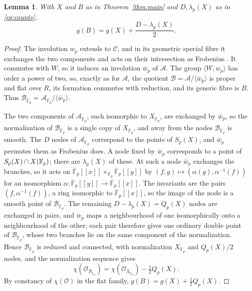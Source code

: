 \documentclass[11pt,a4paper]{article}
\newtheorem{lemma}[theorem]{Lemma}
\theoremstyle{remark}\newtheorem{remark}[theorem]{Remark}
\numberwithin{equation}{section}
\newcommand{\kk}{\overline{\mathbb F}_p}
\begin{document}
	\begin{lemma}\label{lem:aricheta}
		With $X$ and $B$ as in Theorem~\ref{thm:main} and $D,\lambda_p(X)$ as in \eqref{eq:counts},
		\begin{equation}\label{eq:gB}
			g(B)=g(X)+\frac{D-\lambda_p(X)}2.
		\end{equation}
	\end{lemma}
	\begin{proof}
		The involution $w_p$ extends to $\mathscr C$, and in its geometric special fibre it exchanges the two components and acts on their intersection as Frobenius \cite[Proposition 3.8(i)]{Ribet}. It commutes with $W$, so it induces an involution $\bar w_p$ of $\mathscr A$. The group $\langle W,w_p\rangle$ has order a power of two, so, exactly as for $\mathscr A$, the quotient $\mathscr B=\mathscr A/\langle\bar w_p\rangle$ is proper and flat over $R$, its formation commutes with reduction, and its generic fibre is $B$. Thus $\mathscr B_{\kk}=\mathscr A_{\kk}/\langle\bar w_p\rangle$.
		
		The two components of $\mathscr A_{\kk}$, each isomorphic to $X_{\kk}$, are exchanged by $\bar w_p$, so the normalization of $\mathscr B_{\kk}$ is a single copy of $X_{\kk}$, and away from the nodes $\mathscr B_{\kk}$ is smooth. The $D$ nodes of $\mathscr A_{\kk}$ correspond to the points of $S_p(X)$, and $\bar w_p$ permutes them as Frobenius does. A node fixed by $\bar w_p$ corresponds to a point of $S_p(X)\cap X(\mathbb F_p)$; there are $\lambda_p(X)$ of these. At such a node $\bar w_p$ exchanges the branches, so it acts on $\kk[[x]]\times_{\kk}\kk[[y]]$ by $(f,g)\mapsto(\alpha(g),\alpha^{-1}(f))$ for an isomorphism $\alpha\colon\kk[[y]]\to\kk[[x]]$. The invariants are the pairs $(f,\alpha^{-1}(f))$, a ring isomorphic to $\kk[[x]]$, so the image of the node is a smooth point of $\mathscr B_{\kk}$. The remaining $D-\lambda_p(X)=Q_p(X)$ nodes are exchanged in pairs, and $\bar w_p$ maps a neighbourhood of one isomorphically onto a neighbourhood of the other; each pair therefore gives one ordinary double point of $\mathscr B_{\kk}$, whose two branches lie on the same component of the normalization. Hence $\mathscr B_{\kk}$ is reduced and connected, with normalization $X_{\kk}$ and $Q_p(X)/2$ nodes, and the normalization sequence gives
		\[
		\chi(\mathcal O_{\mathscr B_{\kk}})=\chi(\mathcal O_{X_{\kk}})-\tfrac12Q_p(X).
		\]
		By constancy of $\chi(\mathcal O)$ in the flat family, $g(B)=g(X)+\frac12Q_p(X)$.
	\end{proof}
	
\end{document}
